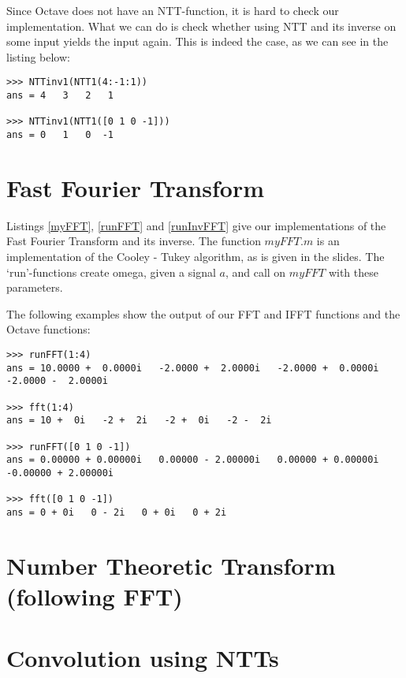 \documentclass{article}
\begin{document}
Since Octave does not have an NTT-function, it is hard to check our implementation.
What we can do is check whether using NTT and its inverse on some input yields
the input again. This is indeed the case, as we can see in the listing below:

\begin{lstlisting}
>>> NTTinv1(NTT1(4:-1:1))
ans = 4   3   2   1

>>> NTTinv1(NTT1([0 1 0 -1]))
ans = 0   1   0  -1
\end{lstlisting}

 
 
 

\section{Fast Fourier Transform}
Listings \ref{myFFT}, \ref{runFFT} and \ref{runInvFFT} give our implementations of the Fast Fourier Transform and its inverse. The function $myFFT.m$ is an implementation of the Cooley - Tukey algorithm, as is given in the slides. The `run'-functions create omega, given a signal $a$, and call on $myFFT$ with these parameters.

The following examples show the output of our FFT and IFFT functions and the Octave functions:

\begin{lstlisting}
>>> runFFT(1:4)
ans = 10.0000 +  0.0000i   -2.0000 +  2.0000i   -2.0000 +  0.0000i   -2.0000 -  2.0000i

>>> fft(1:4)
ans = 10 +  0i   -2 +  2i   -2 +  0i   -2 -  2i

>>> runFFT([0 1 0 -1])
ans = 0.00000 + 0.00000i   0.00000 - 2.00000i   0.00000 + 0.00000i   -0.00000 + 2.00000i

>>> fft([0 1 0 -1])
ans = 0 + 0i   0 - 2i   0 + 0i   0 + 2i
\end{lstlisting}

 
 
 

\section{Number Theoretic Transform (following FFT)}


\section{Convolution using NTTs}
\end{document}

